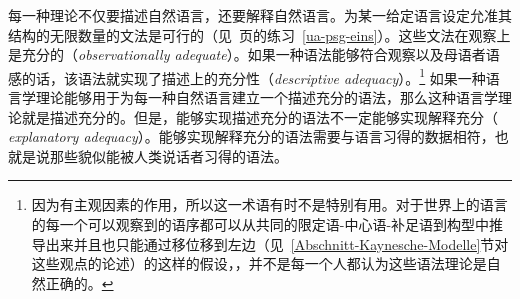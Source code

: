 每一种理论不仅要描述自然语言，还要解释自然语言。为某一给定语言设定允准其结构的无限数量的文法是可行的（见~\pageref{ua-psg-eins}页的练习~\ref{ua-psg-eins}）。这些文法在观察上是充分的（\emph{observationally adequate}）。如果一种语法能够符合观察以及母语者语感的话，该语法就实现了描述上的充分性（\emph{descriptive adequacy}）。\footnote{
因为有主观因素的作用，所以这一术语有时不是特别有用。对于世界上的语言的每一个可以观察到的语序都可以从共同的限定语-中心语-补足语到构型中推导出来并且也只能通过移位移到左边（见~\ref{Abschnitt-Kaynesche-Modelle}节对这些观点的论述）的这样的假设，，并不是每一个人都认为这些语法理论是自然正确的。
}
如果一种语言学理论能够用于为每一种自然语言建立一个描述充分的语法，那么这种语言学理论就是描述充分的。但是，能够实现描述充分的语法不一定能够实现解释充分（ \emph{explanatory adequacy}）。能够实现解释充分的语法需要与语言习得的数据相符，也就是说那些貌似能被人类说话者习得的语法\citep[--25]{Chomsky65a}。

